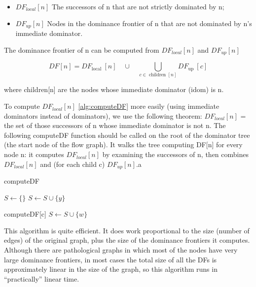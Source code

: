 \begin{itemize}
	\item $DF_{local}[n]$ The successors of n that are not strictly dominated by n;
	\item $DF_{up}[n]$ Nodes in the dominance frontier of n that are not dominated by n’s immediate dominator.
\end{itemize}

The dominance frontier of n can be computed from $DF_{local}[n]$  and $DF_{up}[n]$


$$
	D F[n]=D F_{\text {local }}[n] \quad \cup \quad \bigcup_{c \in \text { children }[n]} D F_{\text {up }}[c]
$$

where children[n] are the nodes whose immediate dominator (idom) is n.


To compute $DF_{local}[n]$ \ref{alg:computeDF} more easily (using immediate dominators instead of dominators), we use the following theorem: $DF_{local}[n]$ = the set of those successors of n whose immediate dominator is not n. The following computeDF function should be called on the root of the dominator tree (the start node of the flow graph). It walks the tree computing DF[n] for every node n: it computes $DF_{local}[n]$ by examining the successors of n, then combines $DF_{local}[n]$ and (for each child c) $DF_{up}[n]$.a

\begin{algorithm}
	\caption{computeDF}\label{alg:computeDF}
	\begin{algorithmic}

		\State $S \gets \{\}$
		 
		\State $S\leftarrow S \cup \{y\}$
		\EndIf
		\EndFor

		\State computeDF[c]
		 
		\State $S\leftarrow S \cup \{w\}$
		\EndIf
		\EndFor
		\EndFor
	\end{algorithmic}
\end{algorithm}

This algorithm is quite efficient. It does work proportional to the size (number of edges) of the original graph, plus the size of the dominance frontiers it computes. Although there are pathological graphs in which most of the nodes have very large dominance frontiers, in most cases the total size of all the DFs is approximately linear in the size of the graph, so this algorithm runs in “practically” linear time.




